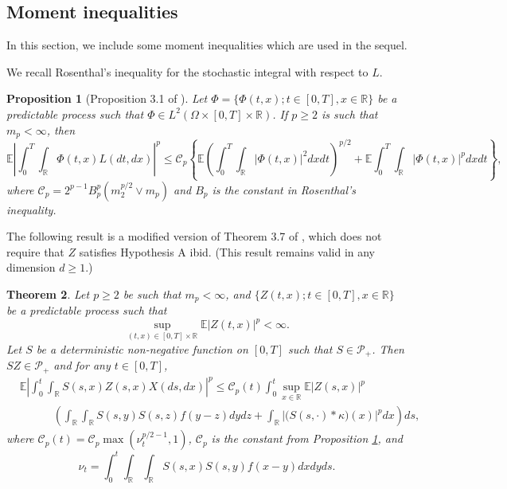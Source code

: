 \documentclass[12pt]{article}
\newtheorem{theorem}{Theorem}[section]
\newtheorem{proposition}[theorem]{Proposition}
\def\cC{\mathcal{C}}
\def\cP{\mathcal{P}}
\def\bE{\mathbb{E}}
\def\bR{\mathbb{R}}
\def\k{\kappa}
\begin{document}
\subsection{Moment inequalities}

In this section, we include some moment inequalities which are used in the sequel.

We recall Rosenthal's inequality for the stochastic integral with respect to $L$. 

\begin{proposition}[Proposition 3.1 of \cite{BN16}]
\label{ros-prop}
Let $\Phi=\{\Phi(t,x);t\in [0,T],x \in \bR\}$ be a predictable process such that $\Phi \in L^2(\Omega \times [0,T] \times \bR)$. If $p\geq 2$ is such that $m_p<\infty$,
then
\begin{equation}
\label{rosenthal}
\bE\left|\int_0^T \int_{\bR}\Phi(t,x) L(dt,dx)\right|^p \leq \cC_p \left\{ \bE \left( \int_0^T \int_{\bR} |\Phi(t,x)|^2 dx dt \right)^{p/2} + \bE \int_0^T \int_{\bR}|\Phi(t,x)|^p dxdt\right\},
\end{equation}
where $\cC_p=2^{p-1}B_p^p(m_2^{p/2} \vee m_p)$ and $B_p$ is the constant in Rosenthal's inequality.
\end{proposition}

The following result is a modified version of Theorem 3.7 of \cite{BJ25}, which does not require that $Z$ satisfies Hypothesis A ibid. (This result remains valid in any dimension $d\geq 1$.)

\begin{theorem}
\label{mom-SZ-th}
Let $p\geq 2$ be such that $m_p<\infty$, and $\{Z(t,x);t\in [0,T],x\in \bR\}$ be a predictable process such that 
\[
\sup_{(t,x)\in [0,T] \times \bR} \bE|Z(t,x)|^p<\infty.
\]
Let $S$ be a deterministic non-negative function on $[0,T]$ such that $S \in \cP_{+}$. Then $SZ \in \cP_{+}$  and for any $t \in [0,T]$,
\begin{align*}
& \bE\left| \int_0^t \int_{\bR}S(s,x)Z(s,x)X(ds,dx)\right|^p \leq \cC_p(t)\int_0^t \sup_{x\in \bR} \bE|Z(s,x)|^p \\
& \quad \quad \quad \left( \int_{\bR}\int_{\bR} S(s,y)S(s,z)f(y-z)dydz+\int_{\bR}\big|\big(S(s,\cdot)*\k\big)(x)\big|^p dx \right) ds,
\end{align*}
where $\cC_p(t)=\cC_p \max(\nu_t^{p/2-1},1)$, $\cC_p$ is the constant from Proposition \ref{ros-prop}, and 
\[
\nu_t=\int_0^t \int_{\bR}\int_{\bR} S(s,x)S(s,y)f(x-y)dxdyds.
\]
\end{theorem}
\end{document}
